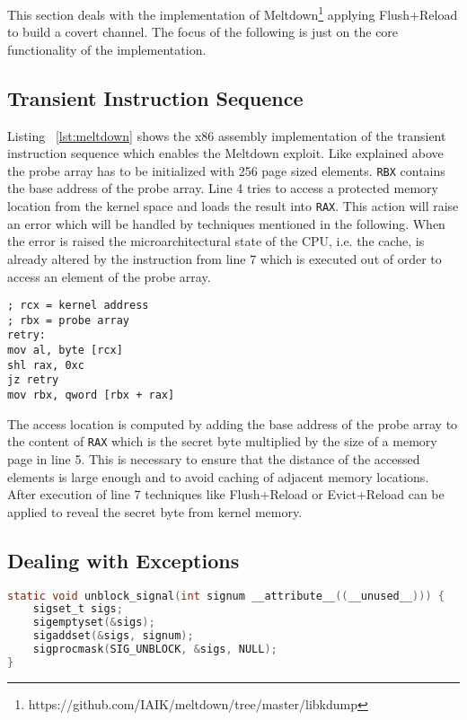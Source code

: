 \documentclass[a4paper,oneside,openright] {scrreprt}
\begin{document}
This section deals with the implementation of Meltdown\footnote{https://github.com/IAIK/meltdown/tree/master/libkdump} applying
Flush+Reload to build a covert channel. The focus of the following is just on the core functionality of the implementation.

\subsection{Transient Instruction Sequence}
\label{ch:intro:motivation:A}

Listing ~\ref{lst:meltdown} shows the x86 assembly implementation of the transient instruction sequence
which enables the Meltdown exploit.
Like explained above the probe array has to be initialized with 256 page sized elements.
\texttt{RBX} contains the base address of the probe array.
Line 4 tries to access a protected memory location from the kernel space and loads the result into \texttt{RAX}. 
This action will raise an error which will be handled by techniques mentioned in the following.
When the error is raised the microarchitectural state of the CPU, i.e. the cache, is already altered 
by the instruction from line 7 which is executed out of order to access an element of the probe array.

\begin{lstlisting}[language={[x86masm]Assembler}, caption=Meltdown: Transient Instruction Sequence, label={lst:meltdown}]
; rcx = kernel address
; rbx = probe array
retry:
mov al, byte [rcx]
shl rax, 0xc
jz retry
mov rbx, qword [rbx + rax]
\end{lstlisting}

The access location is computed by adding the base address of the probe array to the content of \texttt{RAX} which 
is the secret byte multiplied by the size of a memory page in line 5.
This is necessary to ensure that the distance of the accessed elements is large enough and to avoid caching of adjacent memory locations.
After execution of line 7 techniques like Flush+Reload or Evict+Reload can be applied to reveal the secret byte from kernel memory.


\subsection{Dealing with Exceptions}
\label{ch:intro:motivation:A}

\begin{lstlisting}[language=C, caption=Transient Instruction Sequence of Meltdown, label={lst:signal}]
static void unblock_signal(int signum __attribute__((__unused__))) {
    sigset_t sigs;
    sigemptyset(&sigs);
    sigaddset(&sigs, signum);
    sigprocmask(SIG_UNBLOCK, &sigs, NULL);
}
\end{lstlisting}
\end{document}
